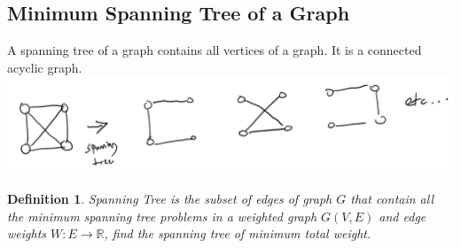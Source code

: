 \documentclass{report}
\newtheorem*{defn}{Definition}
\begin{document}
\subsection{Minimum Spanning Tree of a Graph}
A spanning tree of a graph contains all vertices of a graph. It is a connected acyclic graph.\\
\includegraphics[scale=0.5]{SpanningTree1.png}
\begin{defn}
Spanning Tree is the subset of edges of graph $G$ that contain all the minimum spanning tree problems in a weighted graph $G(V,E)$ and edge weights $W:E\rightarrow\mathbb{R}$, find the spanning tree of minimum total weight.
\end{defn}
\end{document}
